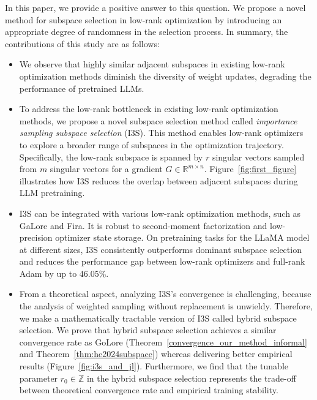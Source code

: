 In this paper, we provide a positive answer to this question.  
We propose a novel method for subspace selection in low-rank optimization by introducing an appropriate degree of randomness in the selection process. In summary, the contributions of this study are as follows:
\begin{itemize}
    \item We observe that highly similar adjacent subspaces in existing low-rank optimization methods diminish the diversity of weight updates, degrading the performance of pretrained LLMs.  
    \item To address the low-rank bottleneck in existing low-rank optimization methods, we propose a novel subspace selection method called \emph{importance sampling subspace selection} (I3S). This method enables low-rank optimizers to explore a broader range of subspaces in the optimization trajectory. Specifically, the low-rank subspace is spanned by $r$ singular vectors sampled from $m$ singular vectors for a gradient $G \in \mathbb{R}^{m \times n}$. Figure~\ref{fig:first_figure} illustrates how I3S reduces the overlap between adjacent subspaces during LLM pretraining.  
    \item I3S can be integrated with various low-rank optimization methods, such as GaLore and Fira. It is robust to second-moment factorization and low-precision optimizer state storage. On pretraining tasks for the LLaMA model at different sizes, I3S consistently outperforms dominant subspace selection and reduces the performance gap between low-rank optimizers and full-rank Adam by up to 46.05\%.  
    \item From a theoretical aspect, analyzing I3S's convergence is challenging, because the analysis of weighted sampling without replacement is unwieldy. Therefore, we make a mathematically tractable version of I3S called hybrid subspace selection.  
    We prove that hybrid subspace selection achieves a similar convergence rate as GoLore \cite{he2024subspace} (Theorem~\ref{convergence_our_method_informal} and Theorem~\ref{thm:he2024subspace}) whereas delivering better empirical results (Figure~\ref{fig:i3s_and_jl}). Furthermore, we find that  the tunable parameter $r_0 \in \mathbb{Z}$ in the hybrid subspace selection represents the trade-off between theoretical convergence rate and empirical training stability.
\end{itemize}

